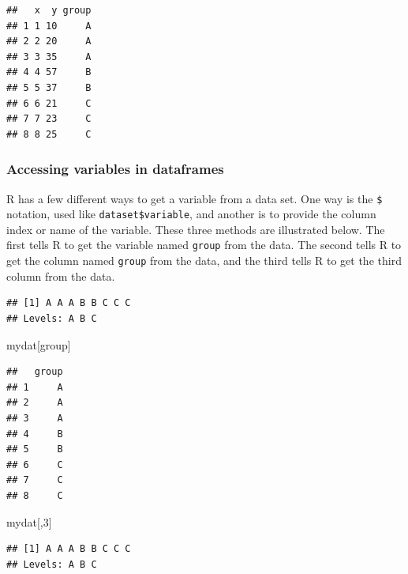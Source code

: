 \documentclass[
]{article}
\newenvironment{Shaded}{\begin{snugshade}}{\end{snugshade}}
\newcommand{\DecValTok}[1]{\textcolor[rgb]{0.00,0.00,0.81}{#1}}
\newcommand{\NormalTok}[1]{#1}
\newcommand{\SpecialCharTok}[1]{\textcolor[rgb]{0.00,0.00,0.00}{#1}}
\newcommand{\StringTok}[1]{\textcolor[rgb]{0.31,0.60,0.02}{#1}}
\begin{document}
\begin{verbatim}
##   x  y group
## 1 1 10     A
## 2 2 20     A
## 3 3 35     A
## 4 4 57     B
## 5 5 37     B
## 6 6 21     C
## 7 7 23     C
## 8 8 25     C
\end{verbatim}

\hypertarget{accessing-variables-in-dataframes}{%
\subsubsection{Accessing variables in dataframes}\label{accessing-variables-in-dataframes}}

R has a few different ways to get a variable from a data set. One way is
the \texttt{\$} notation, used like \texttt{dataset\$variable}, and another is to
provide the column index or name of the variable. These three methods
are illustrated below. The first tells R to get the variable named
\texttt{group} from the data. The second tells R to get the column named
\texttt{group} from the data, and the third tells R to get the third column
from the data.

\begin{Shaded}
\end{Shaded}

\begin{verbatim}
## [1] A A A B B C C C
## Levels: A B C
\end{verbatim}

\begin{Shaded}
\begin{Highlighting}[]
\NormalTok{mydat[}\StringTok{\textquotesingle{}group\textquotesingle{}}\NormalTok{] }
\end{Highlighting}
\end{Shaded}

\begin{verbatim}
##   group
## 1     A
## 2     A
## 3     A
## 4     B
## 5     B
## 6     C
## 7     C
## 8     C
\end{verbatim}

\begin{Shaded}
\begin{Highlighting}[]
\NormalTok{mydat[,}\DecValTok{3}\NormalTok{]}
\end{Highlighting}
\end{Shaded}

\begin{verbatim}
## [1] A A A B B C C C
## Levels: A B C
\end{verbatim}
\end{document}
